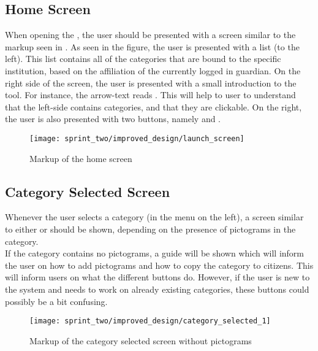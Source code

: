 \subsection{Home Screen}
\label{sec:home_screen}
When opening the \ct, the user should be presented with a screen similar to the markup seen in . As seen in the figure, the user is presented with a list (to the left). This list contains all of the categories that are bound to the specific institution, based on the affiliation of the currently logged in guardian. On the right side of the screen, the user is presented with a small introduction to the tool. For instance, the arrow-text reads . This will help to user to understand that the left-side contains categories, and that they are clickable. On the right, the user is also presented with two buttons, namely  and .

\begin{figure}[!htbp]
    \centering
    \texttt{[image: sprint\_two/improved\_design/launch\_screen]}
    \caption{Markup of the home screen}
    \label{fig:improved_design_launch_screen}
\end{figure}

\FloatBarrier

\subsection{Category Selected Screen}
\label{sec:category_selected_screen}
Whenever the user selects a category (in the menu on the left), a screen similar to either  or  should be shown, depending on the presence of pictograms in the category.\\

If the category contains no pictograms, a guide will be shown which will inform the user on how to add pictograms and how to copy the category to citizens. This will inform users on what the different buttons do. However, if the user is new to the system and needs to work on already existing categories, these buttons could possibly be a bit confusing. \\

\begin{figure}[!htbp]
    \centering
    \texttt{[image: sprint\_two/improved\_design/category\_selected\_1]}
    \caption{Markup of the category selected screen without pictograms}
    \label{fig:improved_design_category_selected_1}
\end{figure}

